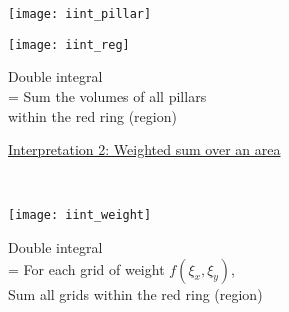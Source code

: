 \documentclass[class=article, crop=false, 12pt]{standalone}
\begin{document}
\begin{center}
    \begin{minipage}{0.6\textwidth}
        \texttt{[image: iint\_pillar]}
    \end{minipage}
    \begin{minipage}{0.3\textwidth}
        \centering
    \end{minipage}
\end{center}

\begin{center}
    \begin{minipage}{0.4\textwidth}
        \texttt{[image: iint\_reg]}
    \end{minipage}
    \hspace{0.05\textwidth}
    \begin{minipage}{0.4\textwidth}
        \centering
        \begin{framed}
            Double integral \\
            = Sum the volumes of all pillars\\
            within the red ring (region)
        \end{framed}
    \end{minipage}
\end{center}



\ul{Interpretation 2: Weighted sum over an area}

\\


\begin{center}
    \begin{minipage}{0.4\textwidth}
        \texttt{[image: iint\_weight]}
    \end{minipage}
    \hspace{0.05\textwidth}
    \begin{minipage}{0.5\textwidth}
        \centering
        \begin{framed}
            Double integral \\
            = For each grid of weight $f(\xi_x,\xi_y)$,\\
            Sum all grids within the red ring (region)
        \end{framed}
    \end{minipage}
\end{center}
\end{document}
